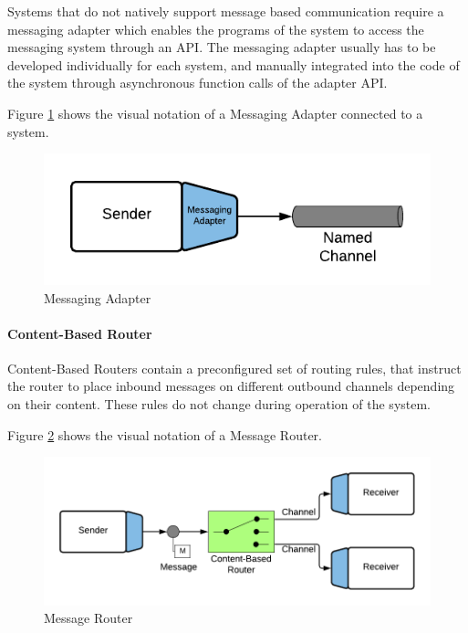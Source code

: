 Systems that do not natively support message based communication require a messaging adapter which enables the programs of the system to access the messaging system through an API. The messaging adapter usually has to be developed individually for each system, and manually integrated into the code of the system through asynchronous function calls of the adapter API.

Figure \ref{messaging:adapter} shows the visual notation of a Messaging Adapter connected to a system.

\begin{figure}[H]
    \centering
    \includegraphics[scale=0.6]{Diagrams/Messaging/4. Messaging Adapter.pdf}
    \caption{Messaging Adapter}
    \label{messaging:adapter}
\end{figure}

\paragraph{Content-Based Router}

Content-Based Routers contain a preconfigured set of routing rules, that instruct the router to place inbound messages on different outbound channels depending on their content. These rules do not change during operation of the system.

Figure \ref{messaging:router} shows the visual notation of a Message Router.

\begin{figure}[H]
    \centering
    \includegraphics[scale=0.6]{Diagrams/Messaging/5. Message Router.pdf}
    \caption{Message Router}
    \label{messaging:router}
\end{figure}

